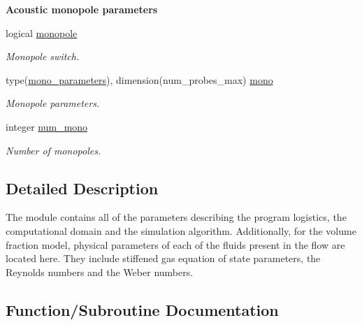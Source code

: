\begin{Indent}\textbf{ Acoustic monopole parameters}\par
\begin{DoxyCompactItemize}
\item 
logical \hyperlink{namespacem__global__parameters_a459b1e7574742f115d5562325c575428}{monopole}
\begin{DoxyCompactList}\small\item\em Monopole switch. \end{DoxyCompactList}\item 
type(\hyperlink{structm__derived__types_1_1mono__parameters}{mono\+\_\+parameters}), dimension(num\+\_\+probes\+\_\+max) \hyperlink{namespacem__global__parameters_ac91cb1bc506e2e71e46001986a7232b4}{mono}
\begin{DoxyCompactList}\small\item\em Monopole parameters. \end{DoxyCompactList}\item 
integer \hyperlink{namespacem__global__parameters_a987e51cca357206f1e35d38a1cb7e5e6}{num\+\_\+mono}
\begin{DoxyCompactList}\small\item\em Number of monopoles. \end{DoxyCompactList}\end{DoxyCompactItemize}
\end{Indent}


\subsection{Detailed Description}
The module contains all of the parameters describing the program logistics, the computational domain and the simulation algorithm. Additionally, for the volume fraction model, physical parameters of each of the fluids present in the flow are located here. They include stiffened gas equation of state parameters, the Reynolds numbers and the Weber numbers. 

\subsection{Function/\+Subroutine Documentation}
\mbox{\label{namespacem__global__parameters_a433eac37597eb46a3cac84ca0471f5d3}} 
